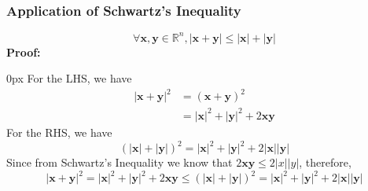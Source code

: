 \documentclass{article}
\begin{document}
\subsubsection{Application of Schwartz's Inequality}
\begin{equation*}
    \forall \mathbf{x, y} \in \mathbb{R}^n, |\mathbf{x+y}| \leq |\mathbf{x}| + |\mathbf{y}| \tag{1.4.9}
\end{equation*}
\textbf{Proof:}
\begin{addmargin}[10px]{0px}
    For the LHS, we have
    \begin{equation*}
       \begin{split}
            |\mathbf{x+y}|^2 &= (\mathbf{x+y})^2\\
            &= |\mathbf{x}|^2 + |\mathbf{y}|^2 + 2\mathbf{xy}
       \end{split} 
    \end{equation*} 
    For the RHS, we have
    \begin{equation*}
        (|\mathbf{x}| + |\mathbf{y}|)^2 = |\mathbf{x}|^2 + |\mathbf{y}|^2 + 2\mathbf{|x||y|}
    \end{equation*}
    Since from Schwartz's Inequality we know that $2\mathbf{xy} \leq 2|x||y|$, therefore,
    \begin{equation*}
        |\mathbf{x+y}|^2 = |\mathbf{x}|^2 + |\mathbf{y}|^2 + 2 \mathbf{xy} \leq (\mathbf{|x| + |y|})^2 = |\mathbf{x}|^2 + |\mathbf{y}|^2 + 2 |\mathbf{x}||\mathbf{y}|
    \end{equation*}
\end{addmargin}
\end{document}
